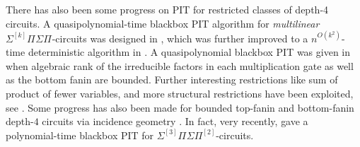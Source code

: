 \documentclass[10pt,a4paper]{article}
\newcommand{\SPSP}[3]{\Sigma^{#1}\Pi^{#2}\Sigma\Pi^{#3}}
\numberwithin{equation}{section}
\begin{document}
There has also been some progress on PIT for restricted classes of depth-4 circuits. A quasipolynomial-time blackbox PIT algorithm for \emph{multilinear} $\SPSP{[k]}{}{}$-circuits was designed in \cite{karnin2013deterministic}, which was further improved to a $n^{O(k^2)}$-time deterministic algorithm in \cite{saraf2018black}. A quasipolynomial blackbox PIT was given in \cite{beecken2013algebraic,DBLP:conf/coco/0001S16a} when algebraic rank of the irreducible factors in each multiplication gate as well as the bottom fanin are bounded. Further interesting restrictions like sum of product of fewer variables, and more structural restrictions have been exploited, see \cite{forbes2013quasipolynomial,agrawal2013quasi, forbes2015deterministic,mukhopadhyay2016depth,DBLP:journals/toc/0001S17}. Some progress has also been made for bounded top-fanin and bottom-fanin depth-$4$ circuits via incidence geometry \cite{gupta2014algebraic,shpilka2019sylvester,peleg2020generalized}. In fact, very recently, \cite{peleg2020polynomial} gave a polynomial-time blackbox PIT for $\SPSP{[3]}{}{[2]}$-circuits.
\end{document}
